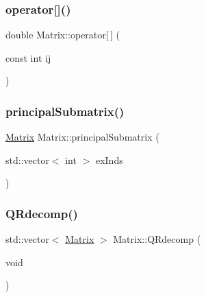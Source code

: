 \mbox{\label{class_matrix_a0a5a42b681f5ea018e1bc6b6453b86e2}} 
\subsubsection{\texorpdfstring{operator[]()}{operator[]()}}
{\footnotesize\ttfamily double Matrix\+::operator\mbox{[}$\,$\mbox{]} (\begin{DoxyParamCaption}\item[{const int}]{ij }\end{DoxyParamCaption})}

\mbox{\label{class_matrix_a98b1c60f665125f2da72069314794820}} 
\subsubsection{\texorpdfstring{principal\+Submatrix()}{principalSubmatrix()}}
{\footnotesize\ttfamily \mbox{\hyperlink{class_matrix}{Matrix}} Matrix\+::principal\+Submatrix (\begin{DoxyParamCaption}\item[{std\+::vector$<$ int $>$}]{ex\+Inds }\end{DoxyParamCaption})}

\mbox{\label{class_matrix_ae7c92ceca24b8ca00926c93180c4cc24}} 
\subsubsection{\texorpdfstring{Q\+Rdecomp()}{QRdecomp()}}
{\footnotesize\ttfamily std\+::vector$<$ \mbox{\hyperlink{class_matrix}{Matrix}} $>$ Matrix\+::\+Q\+Rdecomp (\begin{DoxyParamCaption}\item[{void}]{ }\end{DoxyParamCaption})}

\mbox{\label{class_matrix_a1385f13513c2f00cf9dbe9eb45ccbc01}} 
